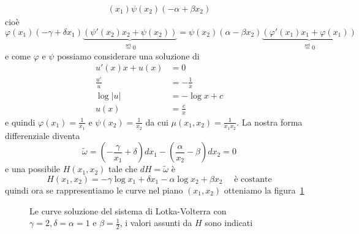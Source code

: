 \begin{example}
\begin{align*}
    {(x_{1})}\psi {(x_{2})} {(-\alpha + \beta x_{2})}
\end{align*}
    cioè
\[
    \varphi {(x_{1})}{(-\gamma + \delta x_{1})} \underbrace{\left( \psi'{(x_{2})}x_{2} +
    \psi {(x_{2})} \right)}_{\overset{\text{set}}{=}0}  = \psi {(x_{2})} {(\alpha - \beta x_{2})}
    \underbrace{\left(
\varphi'{(x_{1})} x_{1} + \varphi {(x_{1})} \right)}_{ \overset{\text{set}}{=}0} 
\]
    e come \(\varphi \) e \(\psi\) possiamo considerare una soluzione di
    \begin{align*}
        u'{(x)} x + u{(x)} &= 0 \\
        \frac{u'}{u} &= -\frac{1}{x} \\
        \log |u| &= -\log x + c \\
        u{(x)} &= \frac{c}{x}
    \end{align*}
    e quindi \(\varphi {(x_{1})} = \frac{1}{x_{1}}\) e \(\psi{(x_{2})} =
    \frac{1}{x_{2}}\) da cui \(\mu{(x_{1}, x_{2})} = \frac{1}{x_{1} x_{2}}\). La
    nostra forma differenziale diventa
\[
    \tilde{\omega} = {\left( - \frac{\gamma}{x_{1}} + \delta \right)} dx_{1} - {\left(
    \frac{\alpha}{x_{2}} - \beta \right)} dx_{2} = 0
\]
    e una possibile \(H{(x_{1}, x_{2})}\) tale che \(dH = \tilde{\omega} \) è 
\[
    H{(x_{1}, x_{2})} = -\gamma \log x_{1} + \delta x_{1} - \alpha \log x_{2} +
    \beta x_{2} \quad \text{ è costante}
\]
    quindi ora se rappresentiamo le curve nel piano \((x_{1}, x_{2})\) otteniamo
    la figura~\ref{fig:lotka-volterra}
    \begin{figure}[ht]
        \centering
    \caption{Le curve soluzione del sistema di
    Lotka-Volterra con \(\gamma = 2, \delta = \alpha = 1\) e \(\beta =
\frac{1}{2}\), i valori assunti da \(H\) sono indicati}\label{fig:lotka-volterra} 
    \end{figure}
    
\end{example}
